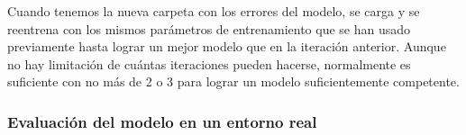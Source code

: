 Cuando tenemos la nueva carpeta con los errores del modelo, se carga y se reentrena con los mismos parámetros de entrenamiento que se han usado previamente hasta lograr un mejor modelo que en la iteración anterior. Aunque no hay limitación de cuántas iteraciones pueden hacerse, normalmente es suficiente con no más de 2 o 3 para lograr un modelo suficientemente competente.

\subsubsection*{Evaluación del modelo en un entorno real}

\newpage
